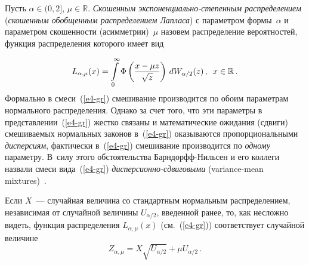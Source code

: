 \begin{multicols}{2}
Пусть $\alpha\in(0,2]$, $\mu\in\mathbb{R}$. \textit{Скошенным
экс\-по\-нен\-ци\-аль\-но-сте\-пен\-ным распределением} (\textit{скошенным обобщенным
распределением Лапласа}) с параметром формы~$\alpha$ и параметром
скошенности (асимметрии)~$\mu$ назовем распределение вероятностей,
функция распределения которого имеет вид

\noindent
\begin{equation}
L_{\alpha,\mu}(x)=\int\limits_{0}^{\infty}\Phi\left(\displaystyle\frac{\displaystyle x-\mu
z\mathstrut}{\displaystyle \sqrt{z}\mathstrut}\right)\,dW_{\alpha/2}(z)\,,\enskip x\in\mathbb{R}\,.
\label{e4-gr}
\end{equation}
Формально в смеси~(\ref{e4-gr}) смешивание производится по обоим параметрам
нормального распределения. Однако за счет того, что эти параметры в
пред\-став\-ле\-нии~(\ref{e4-gr}) жестко связаны и математические ожидания (сдвиги)
смешиваемых нормальных законов в~(\ref{e4-gr}) оказываются пропорциональными
\textit{дисперсиям}, фактически в~(\ref{e4-gr}) смешивание производится по 
\textit{одному} параметру. В~силу этого обстоятельства Барн\-дорфф-Ниль\-сен
и его коллеги назвали смеси вида~(\ref{e4-gr}) \textit{дис\-пер\-си\-он\-но-сдви\-го\-вы\-ми}
(variance-mean mixtures)~\cite{BNKS1982}.

\pagebreak

Если $X$~--- случайная величина со стандартным нормальным
распределением, независимая от случайной величины $U_{\alpha/2}$,
введенной ранее, то, как несложно видеть, функция распределения
$L_{\alpha,\mu}(x)$ (см.~(\ref{e4-gr})) соответствует случайной величине
$$
Z_{\alpha,\mu}=X\sqrt{U_{\alpha/2}}+\mu U_{\alpha/2}\,.
$$


\end{multicols}
